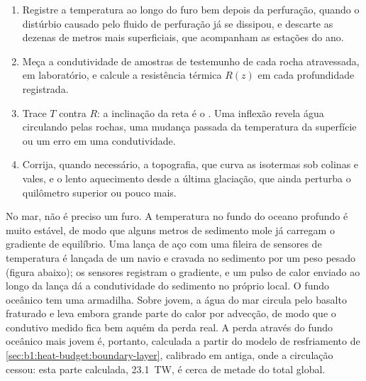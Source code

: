 \begin{method}\label{met:b1:heat-budget:borehole}
\begin{enumerate}
  \item Registre a temperatura ao longo do furo bem depois da perfuração, quando o
        distúrbio causado pelo fluido de perfuração já se dissipou, e descarte as
        dezenas de metros mais superficiais, que acompanham as estações do ano.
  \item Meça a condutividade de amostras de testemunho de cada rocha atravessada, em laboratório,
        e calcule a resistência térmica $R(z)$ em cada
        profundidade registrada.
  \item Trace $T$ contra $R$: a inclinação da reta é o .
        Uma inflexão revela água circulando pelas rochas, uma mudança passada da
        temperatura da superfície ou um erro em uma condutividade.
  \item Corrija, quando necessário, a topografia, que curva as isotermas
        sob colinas e vales, e o lento aquecimento desde a última
        glaciação, que ainda perturba o quilômetro superior ou pouco mais.
\end{enumerate}
\end{method}

No mar, não é preciso um furo. A temperatura no fundo do oceano profundo é
muito estável, de modo que alguns metros de sedimento mole já carregam o
gradiente de equilíbrio. Uma lança de aço com uma fileira de sensores de temperatura é
lançada de um navio e cravada no sedimento por um peso pesado
(figura abaixo); os sensores registram o gradiente, e um
pulso de calor enviado ao longo da lança dá a condutividade do sedimento no próprio local.
O fundo oceânico tem uma armadilha. Sobre  jovem, a água do mar circula pelo
basalto fraturado e leva embora grande parte do calor por advecção, de modo que o
 condutivo medido fica bem aquém da perda real. A perda
através do fundo oceânico mais jovem é, portanto, calculada a partir do modelo de resfriamento
de \cref{sec:b1:heat-budget:boundary-layer}, calibrado em  antiga, onde
a circulação cessou: esta parte calculada, \qty{23.1}{TW}, é cerca de metade
do total global. %

